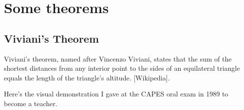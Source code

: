 \newpage

\section{Some theorems} %
\label{sec:some_theorems}

\subsection{Viviani's Theorem} %
\label{sub:viviani_s_theorem}
Viviani's theorem, named after Vincenzo Viviani, states that the sum of the shortest distances from any interior point to the sides of an equilateral triangle equals the length of the triangle's altitude.
[Wikipedia].

Here's the visual demonstration I gave at the CAPES oral exam in 1989 to become a teacher.

